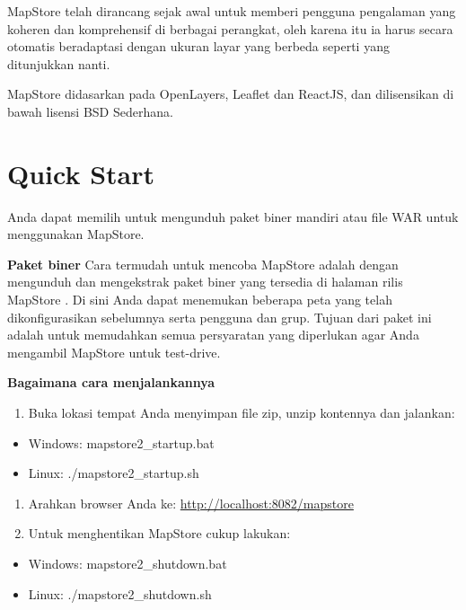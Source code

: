 \documentclass[]{book}
\providecommand{\tightlist}{%
  \setlength{\itemsep}{0pt}\setlength{\parskip}{0pt}}
\begin{document}
MapStore telah dirancang sejak awal untuk memberi pengguna pengalaman yang koheren dan komprehensif di berbagai perangkat, oleh karena itu ia harus secara otomatis beradaptasi dengan ukuran layar yang berbeda seperti yang ditunjukkan nanti.

MapStore didasarkan pada OpenLayers, Leaflet dan ReactJS, dan dilisensikan di bawah lisensi BSD Sederhana.

\hypertarget{quick-start}{%
\section{Quick Start}\label{quick-start}}

Anda dapat memilih untuk mengunduh paket biner mandiri atau file WAR untuk menggunakan MapStore.

\textbf{Paket biner}
Cara termudah untuk mencoba MapStore adalah dengan mengunduh dan mengekstrak paket biner yang tersedia di halaman rilis MapStore . Di sini Anda dapat menemukan beberapa peta yang telah dikonfigurasikan sebelumnya serta pengguna dan grup. Tujuan dari paket ini adalah untuk memudahkan semua persyaratan yang diperlukan agar Anda mengambil MapStore untuk test-drive.

\textbf{Bagaimana cara menjalankannya}

\begin{enumerate}
\def\labelenumi{\arabic{enumi}.}
\tightlist
\item
  Buka lokasi tempat Anda menyimpan file zip, unzip kontennya dan jalankan:
\end{enumerate}

\begin{itemize}
\item
  Windows: mapstore2\_startup.bat
\item
  Linux: ./mapstore2\_startup.sh
\end{itemize}

\begin{enumerate}
\def\labelenumi{\arabic{enumi}.}
\setcounter{enumi}{1}
\item
  Arahkan browser Anda ke: \url{http://localhost:8082/mapstore}
\item
  Untuk menghentikan MapStore cukup lakukan:
\end{enumerate}

\begin{itemize}
\item
  Windows: mapstore2\_shutdown.bat
\item
  Linux: ./mapstore2\_shutdown.sh
\end{itemize}
\end{document}
